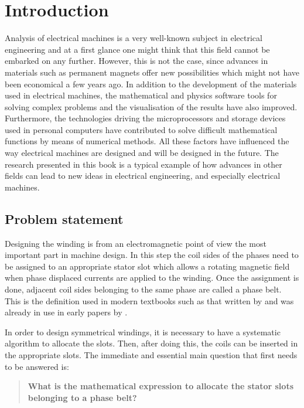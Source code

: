 \chapter{Introduction}
Analysis of electrical machines is a very well-known subject in electrical engineering and at a first glance one might think that this field cannot be embarked on any further. However, this is not the case, since advances in materials such as permanent magnets offer new possibilities which might not have been economical a few years ago. In addition to the development of the materials used in electrical machines, the mathematical and physics software tools for solving complex problems and the visualisation of the results have also improved. Furthermore, the technologies driving the microprocessors and storage devices used in personal computers have contributed to solve difficult mathematical functions by means of numerical methods. All these factors have influenced the way electrical machines are designed and will be designed in the future. The research presented in this book is a typical example of how advances in other fields can lead to new ideas in electrical engineering, and especially electrical machines. 

\section{Problem statement}
\label{sec:problem_statement}
Designing the winding is from an electromagnetic point of view the most important part in machine design. In this step the coil sides of the phases need to be assigned to an appropriate stator slot which allows a rotating magnetic field when phase displaced currents are applied to the winding. Once the assignment is done, adjacent coil sides belonging to the same phase are called a phase belt. This is the definition used in modern textbooks such as that written by \cite{REF-00330} and was already in use in early papers by \cite{REF-00835, REF-00836}.

In order to design symmetrical windings, it is necessary to have a systematic algorithm to allocate the slots. Then, after doing this, the coils can be inserted in the appropriate slots. The immediate and essential main question that first needs to be answered is: 
\begin{quote}
\textbf{What is the mathematical expression to allocate the stator slots belonging to a phase belt?} 
\end{quote}

